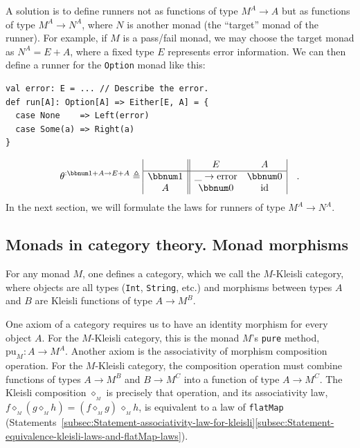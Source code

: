 A solution is to define runners not as functions of type $M^{A}\rightarrow A$
but as functions of type $M^{A}\rightarrow N^{A}$, where $N$ is
another monad (the \textsf{``}target\textsf{''} monad of the runner). For example,
if $M$ is a pass/fail monad, we may choose the target monad as $N^{A}=E+A$,
where a fixed type $E$ represents error information. We can then
define a runner for the \lstinline!Option! monad like this:
\begin{lstlisting}
val error: E = ... // Describe the error.
def run[A]: Option[A] => Either[E, A] = {
  case None    => Left(error)
  case Some(a) => Right(a)
}
\end{lstlisting}
\[
\theta^{:\bbnum 1+A\rightarrow E+A}\triangleq\begin{array}{|c||cc|}
 & E & A\\
\hline \bbnum 1 & \_\rightarrow\text{error} & \bbnum 0\\
A & \bbnum 0 & \text{id}
\end{array}\quad.
\]
In the next section, we will formulate the laws for runners of type
$M^{A}\rightarrow N^{A}$.

\subsection{Monads in category theory. Monad morphisms\label{subsec:Monads-in-category-theory-monad-morphisms}}

For any monad $M$, one defines a category, which we call the $M$-Kleisli
category, where objects are all types (\lstinline!Int!, \lstinline!String!,
etc.) and morphisms between types $A$ and $B$ are Kleisli functions
of type $A\rightarrow M^{B}$. 

One axiom of a category requires us to have an identity morphism for
every object $A$. For the $M$-Kleisli category, this is the monad
$M$\textsf{'}s \lstinline!pure! method, $\text{pu}_{M}:A\rightarrow M^{A}$.
Another axiom is the associativity of morphism composition operation.
For the $M$-Kleisli category, the composition operation must combine
functions of types $A\rightarrow M^{B}$ and $B\rightarrow M^{C}$
into a function of type $A\rightarrow M^{C}$. The Kleisli composition
$\diamond_{_{M}}$ is precisely that operation, and its associativity
law, $f\diamond_{_{M}}(g\diamond_{_{M}}h)=(f\diamond_{_{M}}g)\,\diamond_{_{M}}h$,
is equivalent to a law of \lstinline!flatMap! (Statements~\ref{subsec:Statement-associativity-law-for-kleisli}\textendash \ref{subsec:Statement-equivalence-kleisli-laws-and-flatMap-laws}).

